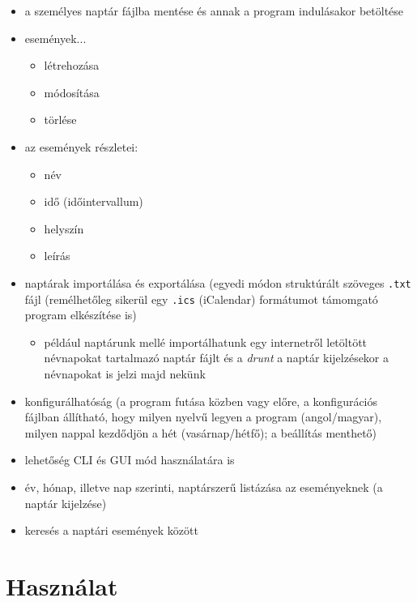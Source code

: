 \documentclass[a4paper]{article}
\begin{document}
	\begin{itemize}
		\item a személyes naptár fájlba mentése és annak a program indulásakor betöltése
		\item események...
			\begin{itemize}
				\item létrehozása
				\item módosítása
				\item törlése
			\end{itemize}
		\item az események részletei:
			\begin{itemize}
				\item név
				\item idő (időintervallum)
				\item helyszín
				\item leírás
			\end{itemize}
		\item naptárak importálása és exportálása (egyedi módon struktúrált szöveges \texttt{.txt} fájl (remélhetőleg sikerül egy \texttt{.ics} (iCalendar) formátumot támomgató program elkészítése is)
			\begin{itemize}
				\item például naptárunk mellé importálhatunk egy internetről letöltött névnapokat tartalmazó naptár fájlt és a \textit{drunt} a naptár kijelzésekor a névnapokat is jelzi majd nekünk
			\end{itemize}
		\item konfigurálhatóság (a program futása közben vagy előre, a konfigurációs fájlban állítható, hogy milyen nyelvű legyen a program (angol/magyar), milyen nappal kezdődjön a hét (vasárnap/hétfő); a beállítás menthető)
		\item lehetőség CLI és GUI mód használatára is
		\item év, hónap, illetve nap szerinti, naptárszerű listázása az eseményeknek (a naptár kijelzése)
		\item keresés a naptári események között
	\end{itemize}

	\section{Használat}
	
\end{document}
